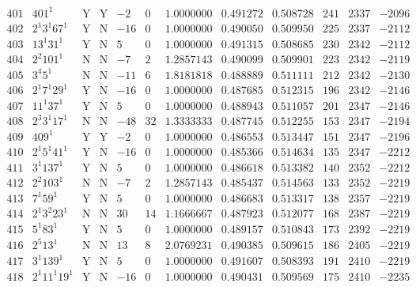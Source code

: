 \documentclass[11pt,reqno,a4letter]{article}
\numberwithin{figure}{section}
\numberwithin{table}{section}
\theoremstyle{plain}
\numberwithin{theorem}{section}
\theoremstyle{definition}
\begin{document}
\begin{table}[ht]
\begin{equation*}
{\begin{array}{cc|cc|ccc|cc|ccc}
 401 & 401^1 & \text{Y} & \text{Y} & -2 & 0 & 1.0000000 & 0.491272 & 0.508728 & 241 & 2337 & -2096 \\
 402 & 2^1 3^1 67^1 & \text{Y} & \text{N} & -16 & 0 & 1.0000000 & 0.490050 & 0.509950 & 225 & 2337 & -2112 \\
 403 & 13^1 31^1 & \text{Y} & \text{N} & 5 & 0 & 1.0000000 & 0.491315 & 0.508685 & 230 & 2342 & -2112 \\
 404 & 2^2 101^1 & \text{N} & \text{N} & -7 & 2 & 1.2857143 & 0.490099 & 0.509901 & 223 & 2342 & -2119 \\
 405 & 3^4 5^1 & \text{N} & \text{N} & -11 & 6 & 1.8181818 & 0.488889 & 0.511111 & 212 & 2342 & -2130 \\
 406 & 2^1 7^1 29^1 & \text{Y} & \text{N} & -16 & 0 & 1.0000000 & 0.487685 & 0.512315 & 196 & 2342 & -2146 \\
 407 & 11^1 37^1 & \text{Y} & \text{N} & 5 & 0 & 1.0000000 & 0.488943 & 0.511057 & 201 & 2347 & -2146 \\
 408 & 2^3 3^1 17^1 & \text{N} & \text{N} & -48 & 32 & 1.3333333 & 0.487745 & 0.512255 & 153 & 2347 & -2194 \\
 409 & 409^1 & \text{Y} & \text{Y} & -2 & 0 & 1.0000000 & 0.486553 & 0.513447 & 151 & 2347 & -2196 \\
 410 & 2^1 5^1 41^1 & \text{Y} & \text{N} & -16 & 0 & 1.0000000 & 0.485366 & 0.514634 & 135 & 2347 & -2212 \\
 411 & 3^1 137^1 & \text{Y} & \text{N} & 5 & 0 & 1.0000000 & 0.486618 & 0.513382 & 140 & 2352 & -2212 \\
 412 & 2^2 103^1 & \text{N} & \text{N} & -7 & 2 & 1.2857143 & 0.485437 & 0.514563 & 133 & 2352 & -2219 \\
 413 & 7^1 59^1 & \text{Y} & \text{N} & 5 & 0 & 1.0000000 & 0.486683 & 0.513317 & 138 & 2357 & -2219 \\
 414 & 2^1 3^2 23^1 & \text{N} & \text{N} & 30 & 14 & 1.1666667 & 0.487923 & 0.512077 & 168 & 2387 & -2219 \\
 415 & 5^1 83^1 & \text{Y} & \text{N} & 5 & 0 & 1.0000000 & 0.489157 & 0.510843 & 173 & 2392 & -2219 \\
 416 & 2^5 13^1 & \text{N} & \text{N} & 13 & 8 & 2.0769231 & 0.490385 & 0.509615 & 186 & 2405 & -2219 \\
 417 & 3^1 139^1 & \text{Y} & \text{N} & 5 & 0 & 1.0000000 & 0.491607 & 0.508393 & 191 & 2410 & -2219 \\
 418 & 2^1 11^1 19^1 & \text{Y} & \text{N} & -16 & 0 & 1.0000000 & 0.490431 & 0.509569 & 175 & 2410 & -2235 \\

\end{array}}
\end{equation*}
\end{table}
\end{document}
